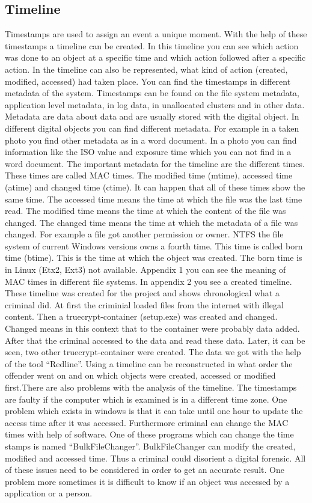 \subsection{Timeline}
Timestamps are used to assign an event a unique moment. With the help of these timestamps a timeline can be created. In this timeline you can see which action was done to an object at a specific time and which action followed after a specific action. In the timeline can also be represented, what kind of action (created, modified, accessed) had taken place. You can find the timestamps in different metadata of the system. Timestamps can be found on the file system metadata, application level metadata, in log data, in unallocated clusters and in other data. Metadata are data about data and are usually stored with the digital object. In different digital objects you can find different metadata. For example in a taken photo you find other metadata as in a word document. In a photo you can find information like the ISO value and exposure time which you can not find in a word document. The important metadata for the timeline are the different times. These times are called MAC times. The modified time (mtime), accessed time (atime) and changed time (ctime). It can happen that all of these times show the same time. The accessed time means the time at which the file was the last time read. The modified time means the time at which the content of the file was changed. The changed time means the time at which the metadata of a file was changed. For example a file got another permission or owner. NTFS the file system of current Windows versions owns a fourth time. This time is called born time (btime). This is the time at which the object was created. The born time is in Linux (Etx2, Ext3) not available. Appendix 1 you can see the meaning of MAC times in different file systems. In appendix 2 you see a created timeline. These timeline was created for the project and shows chronological what a criminal did. At first the criminial loaded files from the internet with illegal content. Then a truecrypt-container (setup.exe) was created and changed. Changed means in this context that to the container were probably data added. After that the criminal accessed to the data and read these data. Later, it can be seen, two other truecrypt-container were created. The data we got with the help of the tool “Redline”. Using a timeline can be reconstructed in what order the offender went on and on which objects were created, accessed or modified first.\newline \newline There are also problems with the analysis of the timeline. The timestamps are faulty if the computer which is examined is in a different time zone. One problem which exists in windows is that it can take until one hour to update the access time after it was accessed. Furthermore criminal can change the MAC times with help of software. One of these programs which can change the time stamps is named “BulkFileChanger”. BulkFileChanger can modify the created, modified and accessed time. Thus a criminal could disorient a digital forensic. All of these issues need to be considered in order to get an accurate result. One problem more sometimes it is difficult to know if an object was accessed by a application or a person. 

